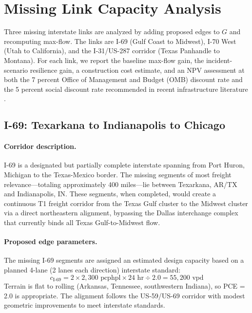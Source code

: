 \section{Missing Link Capacity Analysis}
\label{sec:missing}

Three missing interstate links are analyzed by adding proposed edges to $G$ and recomputing max-flow. The links are I-69 (Gulf Coast to Midwest), I-70 West (Utah to California), and the I-31/US-287 corridor (Texas Panhandle to Montana). For each link, we report the baseline max-flow gain, the incident-scenario resilience gain, a construction cost estimate, and an NPV assessment at both the 7 percent Office of Management and Budget (OMB) discount rate and the 5 percent social discount rate recommended in recent infrastructure literature \citep{IIJA2021}.

\subsection{I-69: Texarkana to Indianapolis to Chicago}

\paragraph{Corridor description.} I-69 is a designated but partially complete interstate spanning from Port Huron, Michigan to the Texas-Mexico border. The missing segments of most freight relevance---totaling approximately 400 miles---lie between Texarkana, AR/TX and Indianapolis, IN. These segments, when completed, would create a continuous T1 freight corridor from the Texas Gulf cluster to the Midwest cluster via a direct northeastern alignment, bypassing the Dallas interchange complex that currently binds all Texas Gulf-to-Midwest flow.

\paragraph{Proposed edge parameters.} The missing I-69 segments are assigned an estimated design capacity based on a planned 4-lane (2 lanes each direction) interstate standard:
\begin{equation}
  c_\text{I-69} = 2 \times 2{,}300 \text{ pcphpl} \times 24 \text{ hr} \div 2.0 = 55{,}200 \text{ vpd}
\end{equation}
Terrain is flat to rolling (Arkansas, Tennessee, southwestern Indiana), so PCE = 2.0 is appropriate. The alignment follows the US-59/US-69 corridor with modest geometric improvements to meet interstate standards.

